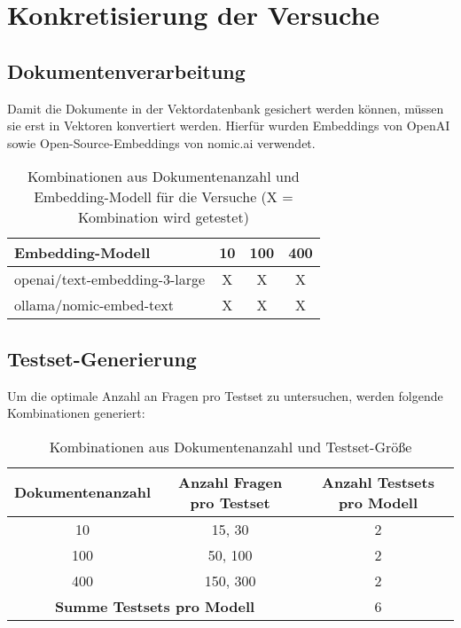 \section{Konkretisierung der Versuche}

\subsection{Dokumentenverarbeitung}

Damit die Dokumente in der Vektordatenbank gesichert werden können, müssen sie erst in Vektoren konvertiert werden.
Hierfür wurden Embeddings von OpenAI sowie Open-Source-Embeddings von nomic.ai \cite{nomic_embed_text_v1_blog} verwendet.

\begin{table}[htbp]
    \centering
    \caption[Kombinationen aus Dokumentenanzahl und Embedding-Modell für die Versuche]{Kombinationen aus Dokumentenanzahl und Embedding-Modell für die Versuche (X = Kombination wird getestet)}
    \begin{tabular}{|l|c|c|c|}
        \hline
        \textbf{Embedding-Modell} & \textbf{10} & \textbf{100} & \textbf{400} \\
        \hline
        openai/text-embedding-3-large & X & X & X \\
        ollama/nomic-embed-text       & X & X & X \\
        \hline
    \end{tabular}
    \label{tab:dokument-erstellung}
\end{table}

\subsection{Testset-Generierung}

Um die optimale Anzahl an Fragen pro Testset zu untersuchen, werden folgende Kombinationen generiert:

\begin{table}[htbp]
    \centering
    \caption{Kombinationen aus Dokumentenanzahl und Testset-Größe}
    \begin{tabular}{|c|c|c|}
        \hline
        \textbf{Dokumentenanzahl} & \textbf{Anzahl Fragen pro Testset} & \textbf{Anzahl Testsets pro Modell} \\
        \hline
        10   & 15, 30    & 2 \\
        100  & 50, 100   & 2 \\
        400 & 150, 300  & 2 \\
        \hline
        \multicolumn{2}{|c|}{\textbf{Summe Testsets pro Modell}} & 6 \\
        \hline
    \end{tabular}
\end{table}

